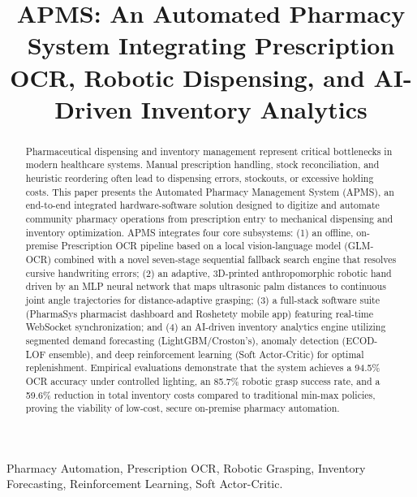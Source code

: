 \documentclass[conference]{IEEEtran}
\begin{document}
\title{APMS: An Automated Pharmacy System Integrating Prescription OCR, Robotic Dispensing, and AI-Driven Inventory Analytics}

\author{}

\maketitle

\begin{abstract}
Pharmaceutical dispensing and inventory management represent critical bottlenecks in modern healthcare systems. Manual prescription handling, stock reconciliation, and heuristic reordering often lead to dispensing errors, stockouts, or excessive holding costs. This paper presents the Automated Pharmacy Management System (APMS), an end-to-end integrated hardware-software solution designed to digitize and automate community pharmacy operations from prescription entry to mechanical dispensing and inventory optimization. APMS integrates four core subsystems: (1) an offline, on-premise Prescription OCR pipeline based on a local vision-language model (GLM-OCR) combined with a novel seven-stage sequential fallback search engine that resolves cursive handwriting errors; (2) an adaptive, 3D-printed anthropomorphic robotic hand driven by an MLP neural network that maps ultrasonic palm distances to continuous joint angle trajectories for distance-adaptive grasping; (3) a full-stack software suite (PharmaSys pharmacist dashboard and Roshetety mobile app) featuring real-time WebSocket synchronization; and (4) an AI-driven inventory analytics engine utilizing segmented demand forecasting (LightGBM/Croston's), anomaly detection (ECOD-LOF ensemble), and deep reinforcement learning (Soft Actor-Critic) for optimal replenishment. Empirical evaluations demonstrate that the system achieves a 94.5\% OCR accuracy under controlled lighting, an 85.7\% robotic grasp success rate, and a 59.6\% reduction in total inventory costs compared to traditional min-max policies, proving the viability of low-cost, secure on-premise pharmacy automation.
\end{abstract}

\begin{IEEEkeywords}
Pharmacy Automation, Prescription OCR, Robotic Grasping, Inventory Forecasting, Reinforcement Learning, Soft Actor-Critic.
\end{IEEEkeywords}
\end{document}
